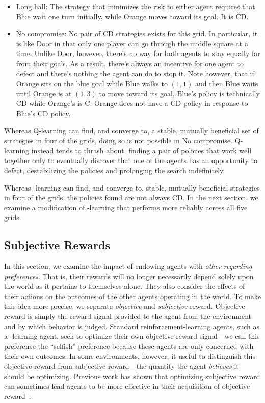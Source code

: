 \documentclass[letterpaper]{article}
\begin{document}
\begin{itemize}
\item{Long hall}: The strategy that minimizes the risk to either agent
requires that Blue wait one turn initially, while Orange
moves toward its goal. It is CD.

\item{No compromise}: No pair of CD strategies exists for this grid. In
particular, it is like Door in that only one player can go through the
middle square at a time. Unlike Door, however, there's no way for both
agents to stay equally far from their goals. As a result, there's
always an incentive for one agent to defect and there's nothing the
agent can do to stop it. Note however, that if Orange sits on the blue
goal while Blue walks to $(1,1)$ and then Blue waits until Orange is
at $(1,3)$ to move toward its goal, Blue's policy is technically CD
while Orange's is C. Orange does not have a CD policy in response to
Blue's CD policy.

\end{itemize}

Whereas Q-learning can find, and converge to, a stable, mutually
beneficial set of strategies in four of the grids, doing so is not
possible in No compromise. Q-learning instead tends to thrash about,
finding a pair of policies that work well together only to eventually
discover that one of the agents has an opportunity to defect,
destabilizing the policies and prolonging the search indefinitely.

Whereas \Q-learning can find, and converge to, stable, mutually
beneficial strategies in four of the grids, the policies found are not
always CD. In the next section, we examine a modification of
\Q-learning that performs more reliably across all five grids.

\subsection{Subjective Rewards}

In this section, we examine the impact of endowing agents
with \emph{other-regarding preferences}. That is, their rewards will
no longer necessarily depend solely upon the world as it pertains to
themselves alone. They also consider the effects of their actions on
the outcomes of the other agents operating in the world. To make this
idea more precise, we separate \emph{objective} and \emph{subjective}
reward. Objective reward is simply the reward signal provided to the
agent from the environment and by which behavior is judged. Standard
reinforcement-learning agents, such as a \Q-learning agent,
seek to optimize their own objective reward signal---we call this preference the ``selfish''
preference because these agents are only concerned with their own outcomes. In
some environments, however, it useful to distinguish this objective
reward from subjective reward---the quantity the agent \emph{believes}
it should be optimizing. Previous work has shown that optimizing
subjective reward can sometimes lead agents to be more effective in
their acquisition of objective reward~\cite{singh09}.
\end{document}
